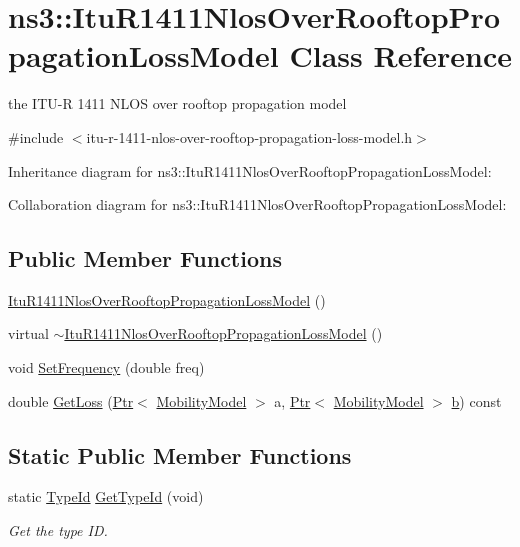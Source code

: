 \hypertarget{classns3_1_1ItuR1411NlosOverRooftopPropagationLossModel}{}\section{ns3\+:\+:Itu\+R1411\+Nlos\+Over\+Rooftop\+Propagation\+Loss\+Model Class Reference}
\label{classns3_1_1ItuR1411NlosOverRooftopPropagationLossModel}


the I\+T\+U-\/R 1411 N\+L\+OS over rooftop propagation model  




{\ttfamily \#include $<$itu-\/r-\/1411-\/nlos-\/over-\/rooftop-\/propagation-\/loss-\/model.\+h$>$}



Inheritance diagram for ns3\+:\+:Itu\+R1411\+Nlos\+Over\+Rooftop\+Propagation\+Loss\+Model\+:


Collaboration diagram for ns3\+:\+:Itu\+R1411\+Nlos\+Over\+Rooftop\+Propagation\+Loss\+Model\+:
\subsection*{Public Member Functions}
\begin{DoxyCompactItemize}
\item 
\hyperlink{classns3_1_1ItuR1411NlosOverRooftopPropagationLossModel_aa173c36ea44d328e68cf45404f333c35}{Itu\+R1411\+Nlos\+Over\+Rooftop\+Propagation\+Loss\+Model} ()
\item 
virtual \hyperlink{classns3_1_1ItuR1411NlosOverRooftopPropagationLossModel_a2ce411db4eb480741a4a5f595a5ce46b}{$\sim$\+Itu\+R1411\+Nlos\+Over\+Rooftop\+Propagation\+Loss\+Model} ()
\item 
void \hyperlink{classns3_1_1ItuR1411NlosOverRooftopPropagationLossModel_a3248a2753e007540853bd6a9483a9b22}{Set\+Frequency} (double freq)
\item 
double \hyperlink{classns3_1_1ItuR1411NlosOverRooftopPropagationLossModel_a73ddf8a5aec66d107cf56b33160dd116}{Get\+Loss} (\hyperlink{classns3_1_1Ptr}{Ptr}$<$ \hyperlink{classns3_1_1MobilityModel}{Mobility\+Model} $>$ a, \hyperlink{classns3_1_1Ptr}{Ptr}$<$ \hyperlink{classns3_1_1MobilityModel}{Mobility\+Model} $>$ \hyperlink{lte__pathloss_8m_a21ad0bd836b90d08f4cf640b4c298e7c}{b}) const 
\end{DoxyCompactItemize}
\subsection*{Static Public Member Functions}
\begin{DoxyCompactItemize}
\item 
static \hyperlink{classns3_1_1TypeId}{Type\+Id} \hyperlink{classns3_1_1ItuR1411NlosOverRooftopPropagationLossModel_a3df254b2b204120c7643ba70723d5094}{Get\+Type\+Id} (void)
\begin{DoxyCompactList}\small\item\em Get the type ID. \end{DoxyCompactList}\end{DoxyCompactItemize}
